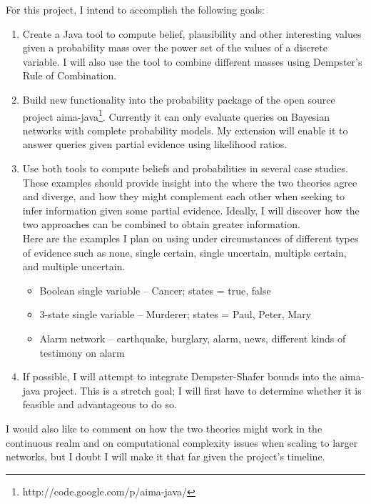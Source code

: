 \documentclass[letterpaper]{article}
\begin{document}
\noindent For this project, I intend to accomplish the following goals:
\begin{enumerate}
\item Create a Java tool to compute belief, plausibility and other interesting values given a probability mass over the power set of the values of a discrete variable.  I will also use the tool to combine different masses using Dempster's Rule of Combination.
\item Build new functionality into the probability package of the open source project aima-java\footnote{http://code.google.com/p/aima-java/}.  Currently it can only evaluate queries on Bayesian networks with complete probability models. My extension will enable it to answer queries given partial evidence using likelihood ratios.
\item Use both tools to compute beliefs and probabilities in several case studies.  These examples should provide insight into the where the two theories agree and diverge, and how they might complement each other when seeking to infer information given some partial evidence.  Ideally, I will discover how the two approaches can be combined to obtain greater information.\\
Here are the examples I plan on using under circumstances of different types of evidence such as none, single certain, single uncertain, multiple certain, and multiple uncertain.
\begin{itemize}
\item Boolean single variable -- Cancer; states = true, false
\item 3-state single variable -- Murderer; states = Paul, Peter, Mary
\item Alarm network -- earthquake, burglary, alarm, news, different kinds of testimony on alarm
\end{itemize}
\item If possible, I will attempt to integrate Dempster-Shafer bounds into the aima-java project.  This is a stretch goal; I will first have to determine whether it is feasible and advantageous to do so.
\end{enumerate}

I would also like to comment on how the two theories might work in the continuous realm and on computational complexity issues when scaling to larger networks, but I doubt I will make it that far given the project's timeline.
\end{document}
